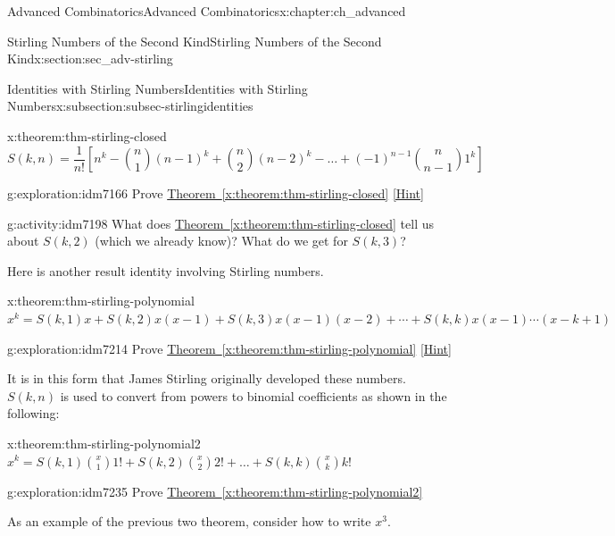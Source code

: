 \documentclass[oneside,10pt,]{book}
\numberwithin{equation}{chapter}
\begin{document}
\begin{chapterptx}{Advanced Combinatorics}{}{Advanced Combinatorics}{}{}{x:chapter:ch_advanced}
\begin{sectionptx}{Stirling Numbers of the Second Kind}{}{Stirling Numbers of the Second Kind}{}{}{x:section:sec_adv-stirling}
\begin{subsectionptx}{Identities with Stirling Numbers}{}{Identities with Stirling Numbers}{}{}{x:subsection:subsec-stirlingidentities}
\begin{theorem}{}{}{x:theorem:thm-stirling-closed}
%
\begin{equation*}
S(k,n) = \frac{1}{n!}\left[n^{k} - \binom{n}{1} \left( n - 1 \right)^{k} + \binom{n}{2} \left( n - 2 \right)^{k} - \ldots + \left( - 1 \right)^{n - 1}\binom{n}{n - 1} 1^{k} \right] 
\end{equation*}
%
\end{theorem}
\begin{exploration}{}{g:exploration:idm7166}%
Prove \hyperref[x:theorem:thm-stirling-closed]{Theorem~\ref{x:theorem:thm-stirling-closed}}%
\space\hspace*{0pt}\hfill{\tiny\hyperlink{g:hint:idm7170-back}{[Hint]}}\end{exploration}
\begin{activity}{}{g:activity:idm7198}%
What does \hyperref[x:theorem:thm-stirling-closed]{Theorem~\ref{x:theorem:thm-stirling-closed}} tell us about \(S(k, 2)\) (which we already know)?  What do we get for \(S(k,3)\)?%
\end{activity}
Here is another result identity involving Stirling numbers.%
\begin{theorem}{}{}{x:theorem:thm-stirling-polynomial}%
\(x^{k} = S\left(k,1 \right)x + S\left(k,2 \right)x\left( x - 1 \right) + S\left(k,3 \right)x\left( x - 1 \right)\left( x - 2 \right) + \cdots
+ S\left(k,k \right)x\left( x - 1 \right)\cdots(x -k + 1)\)%
\end{theorem}
\begin{exploration}{}{g:exploration:idm7214}%
Prove \hyperref[x:theorem:thm-stirling-polynomial]{Theorem~\ref{x:theorem:thm-stirling-polynomial}}%
\space\hspace*{0pt}\hfill{\tiny\hyperlink{g:hint:idm7218-back}{[Hint]}}\end{exploration}
It is in this form that James Stirling originally developed these numbers. \(S(k,n)\) is used to convert from powers to binomial  coefficients as shown in the following:%
\begin{theorem}{}{}{x:theorem:thm-stirling-polynomial2}%
\(x^{k} = S\left(k,1 \right)\binom{x}{1}1! + S\left(k,2 \right) \binom{x}{2}2! + \ldots + S\left(k,k \right)\binom{x}{k} k!\)%
\end{theorem}
\begin{exploration}{}{g:exploration:idm7235}%
Prove \hyperref[x:theorem:thm-stirling-polynomial2]{Theorem~\ref{x:theorem:thm-stirling-polynomial2}}%
\end{exploration}
As an example of the previous two theorem, consider how to write \(x^3\).%
\par

\end{subsectionptx}
\end{sectionptx}
\end{chapterptx}
\end{document}
